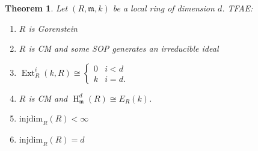 \documentclass[11pt]{book}
\newtheorem{theorem}{Theorem}[chapter]
\numberwithin{equation}{section}
\numberwithin{theorem}{chapter}
\theoremstyle{definition}
\newtheorem*{basic properties}{Basic Properties}
\newtheorem*{Important Remark}{Important Remark}
\theoremstyle{remark}
\newcommand{\m}{\mathfrak{m}}
\newcommand{\Ext}{\operatorname{Ext}}
\renewcommand{\H}{\operatorname{H}}
\begin{document}
\begin{theorem}
	Let $(R,\m,k)$ be a local ring of dimension $d$. TFAE:
	\begin{enumerate}[1)]
		\item $R$ is Gorenstein
		\item[1')] $R$ is CM and some SOP generates an irreducible ideal
		\item 	$\Ext^i_R(k,R)\cong \begin{cases} 0 & i<d \\
			k & i=d. \end{cases}$
		\item $R$ is CM and $\H^d_\m(R)\cong E_R(k)$.
		\item $\mathrm{injdim}_R(R)<\infty$
		\item[4')] $\mathrm{injdim}_R(R)=d$
	\end{enumerate}
\end{theorem}
\end{document}

